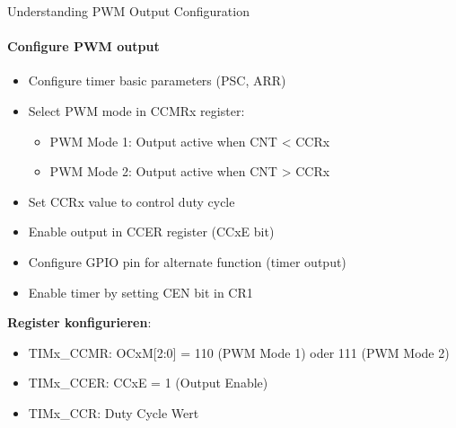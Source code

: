 \begin{concept}{Understanding PWM Output Configuration}
\paragraph{Configure PWM output}
\begin{itemize}
    \item Configure timer basic parameters (PSC, ARR)
    \item Select PWM mode in CCMRx register:
    \begin{itemize}
        \item PWM Mode 1: Output active when CNT < CCRx
        \item PWM Mode 2: Output active when CNT > CCRx
    \end{itemize}
    \item Set CCRx value to control duty cycle
    \item Enable output in CCER register (CCxE bit)
    \item Configure GPIO pin for alternate function (timer output)
    \item Enable timer by setting CEN bit in CR1
\end{itemize}
\textbf{Register konfigurieren}:
    \begin{itemize}
        \item TIMx\_CCMR: OCxM[2:0] = 110 (PWM Mode 1) oder 111 (PWM Mode 2)
        \item TIMx\_CCER: CCxE = 1 (Output Enable)
        \item TIMx\_CCR: Duty Cycle Wert
    \end{itemize}
\end{concept}


